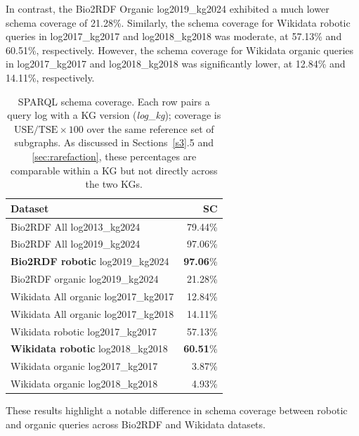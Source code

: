 \documentclass[sw]{iosart2x}
\begin{document}
In contrast, the Bio2RDF Organic log2019\_kg2024 exhibited a much lower schema coverage of 21.28\%. Similarly, the schema coverage for Wikidata robotic queries in log2017\_kg2017 and log2018\_kg2018 was moderate, at 57.13\% and 60.51\%, respectively. However, the schema coverage for Wikidata organic queries in log2017\_kg2017 and log2018\_kg2018 was significantly lower, at 12.84\% and 14.11\%, respectively.

\begin{table}[ht]
\centering
\caption{SPARQL schema coverage. Each row pairs a query log with a KG version (\emph{log}\_\emph{kg}); coverage is $\mathrm{USE}/\mathrm{TSE}\times100$ over the same reference set of subgraphs. As discussed in Sections~\ref{s3}.5 and \ref{sec:rarefaction}, these percentages are comparable within a KG but not directly across the two KGs.}
\label{tab:5}
\begin{tabular}{l|r}
\hline
Dataset & SC \\
\hline
Bio2RDF All log2013\_kg2024 & 79.44\% \\
Bio2RDF All log2019\_kg2024 & 97.06\% \\
\textbf{Bio2RDF robotic }log2019\_kg2024 & \textbf{97.06}\%\\
Bio2RDF organic log2019\_kg2024 & 21.28\% \\
Wikidata All organic log2017\_kg2017 & 12.84\% \\
Wikidata All organic log2017\_kg2018 & 14.11\% \\
Wikidata robotic log2017\_kg2017 & 57.13\% \\
\textbf{Wikidata robotic} log2018\_kg2018 & \textbf{60.51}\% \\
Wikidata organic log2017\_kg2017 & 3.87\%  \\
Wikidata organic log2018\_kg2018 & 4.93\%  \\
\hline
\end{tabular}
\end{table}


These results highlight a notable difference in schema coverage between robotic and organic queries across Bio2RDF and Wikidata datasets.
\end{document}
